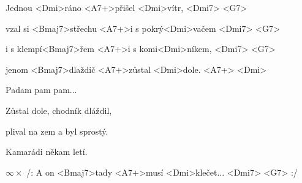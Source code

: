 

\zs
Jednou <Dmi>ráno <A7+>přišel <Dmi>vítr, <Dmi7> <G7>

vzal si <Bmaj7>střechu <A7+>i s pokrý<Dmi>vačem <Dmi7> <G7>

i s klempí<Bmaj7>řem <A7+>i s komi<Dmi>níkem, <Dmi7> <G7>

jenom <Bmaj7>dlaždič <A7+>zůstal <Dmi>dole. <A7+> <Dmi>
\ks

\zs
Padam pam pam...
\ks

\zs
Zůstal dole, chodník dláždil,

plival na zem a byl sprostý.

Kamarádi někam letí.

$\infty\times$ /: A on <Bmaj7>tady <A7+>musí <Dmi>klečet...
<Dmi7> <G7> :/
\ks

\kp
